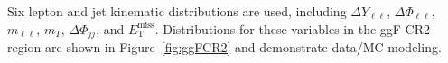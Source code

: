 Six lepton and jet kinematic distributions are used, including $\Delta Y_{\ell\ell}$, $\Delta \Phi_{\ell\ell}$, $m_{\ell\ell}$, $m_T$, $\Delta \Phi_{jj}$, and $\ensuremath{E_{\text{T}}^{\text{miss}}}$. Distributions for these variables in the ggF CR2 region are shown in Figure~\ref{fig:ggFCR2} and demonstrate data/MC modeling.
\begin{figure}[!h]
  \hfill
  \hfill
  \hfill
  \hfill

\end{figure}
